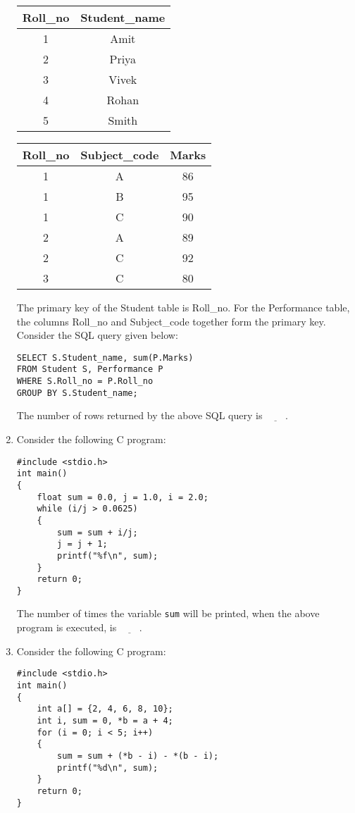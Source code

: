 \documentclass[12pt]{article}
\begin{document}
\begin{enumerate}[label=Q.\arabic*]
\begin{center}
\begin{tabular}{|c|c|}
\hline
Roll\_no & Student\_name \\
\hline
1 & Amit \\
2 & Priya \\
3 & Vivek \\
4 & Rohan \\
5 & Smith \\
\hline
\end{tabular}
\quad
\begin{tabular}{|c|c|c|}
\hline
Roll\_no & Subject\_code & Marks \\
\hline
1 & A & 86 \\
1 & B & 95 \\
1 & C & 90 \\
2 & A & 89 \\
2 & C & 92 \\
3 & C & 80 \\
\hline
\end{tabular}
\end{center}

The primary key of the Student table is Roll\_no. For the Performance table, the columns Roll\_no and Subject\_code together form the primary key. Consider the SQL query given below:

\begin{verbatim}
SELECT S.Student_name, sum(P.Marks)
FROM Student S, Performance P
WHERE S.Roll_no = P.Roll_no
GROUP BY S.Student_name;
\end{verbatim}

The number of rows returned by the above SQL query is $\underline{\quad\quad}$.

\item Consider the following C program:

\begin{verbatim}
#include <stdio.h>
int main()
{
    float sum = 0.0, j = 1.0, i = 2.0;
    while (i/j > 0.0625)
    {
        sum = sum + i/j;
        j = j + 1;
        printf("%f\n", sum);
    }
    return 0;
}
\end{verbatim}

The number of times the variable \texttt{sum} will be printed, when the above program is executed, is $\underline{\quad\quad}$.

\item Consider the following C program:

\begin{verbatim}
#include <stdio.h>
int main()
{
    int a[] = {2, 4, 6, 8, 10};
    int i, sum = 0, *b = a + 4;
    for (i = 0; i < 5; i++)
    {
        sum = sum + (*b - i) - *(b - i);
        printf("%d\n", sum);
    }
    return 0;
}
\end{verbatim}


\end{enumerate}
\end{document}

